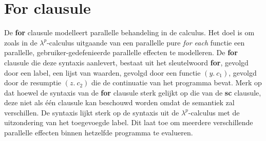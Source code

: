 \section{For clausule}
De \textbf{for} clausule modelleert parallelle behandeling in de calculus. Het doel is om zoals in de $\lambda^p$-calculus uitgaande van een parallelle pure \emph{for each} functie een parallelle, gebruiker-gedefenieerde parallelle effecten te modelleren\cite{Xie2021}. \newline 
De \textbf{for} clausule die deze syntaxis aanlevert, bestaat uit het sleutelwoord \textbf{for}, gevolgd door een label,  een lijst van waarden, gevolgd door een functie $(y. \ 
 c_{1})$, gevolgd door de resumptie $(z. \  c_{2})$ die de continuatie van het programma bevat. Merk op dat hoewel de syntaxis van de \textbf{for} clausule sterk gelijkt op die van de \textbf{sc} clausule, deze niet als \'e\'en clausule kan beschouwd worden omdat de semantiek zal verschillen. De syntaxis lijkt sterk op de syntaxis uit de $\lambda^p$-calculus met de uitzondering van het toegevoegde label. Dit laat toe om meerdere verschillende parallelle effecten binnen hetzelfde programma te evalueren. \newline 





